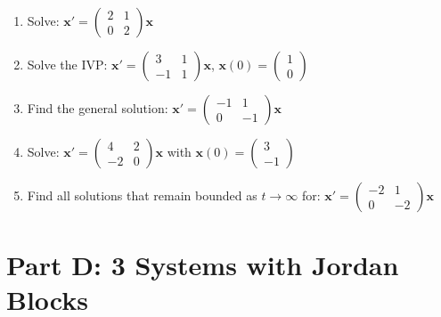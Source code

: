 \documentclass[12pt]{article}
\begin{document}
\begin{enumerate}[start=11]
\item Solve: $\mathbf{x}' = \begin{pmatrix} 2 & 1 \\ 0 & 2 \end{pmatrix}\mathbf{x}$

\item Solve the IVP: $\mathbf{x}' = \begin{pmatrix} 3 & 1 \\ -1 & 1 \end{pmatrix}\mathbf{x}$, $\mathbf{x}(0) = \begin{pmatrix} 1 \\ 0 \end{pmatrix}$

\item Find the general solution: $\mathbf{x}' = \begin{pmatrix} -1 & 1 \\ 0 & -1 \end{pmatrix}\mathbf{x}$

\item Solve: $\mathbf{x}' = \begin{pmatrix} 4 & 2 \\ -2 & 0 \end{pmatrix}\mathbf{x}$ with $\mathbf{x}(0) = \begin{pmatrix} 3 \\ -1 \end{pmatrix}$

\item Find all solutions that remain bounded as $t \to \infty$ for:
$\mathbf{x}' = \begin{pmatrix} -2 & 1 \\ 0 & -2 \end{pmatrix}\mathbf{x}$
\end{enumerate}

\section*{Part D: 3 Systems with Jordan Blocks}
\end{document}
